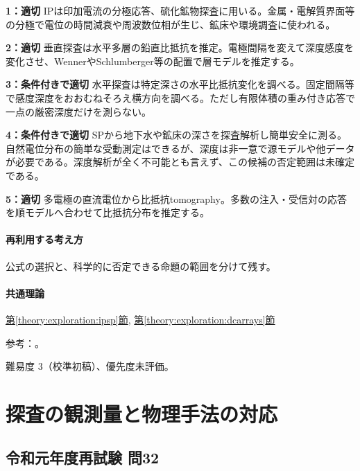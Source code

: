 \noindent\textbf{1：適切} IPは印加電流の分極応答、硫化鉱物探査に用いる。金属・電解質界面等の分極で電位の時間減衰や周波数位相が生じ、鉱床や環境調査に使われる。\par

\noindent\textbf{2：適切} 垂直探査は水平多層の鉛直比抵抗を推定。電極間隔を変えて深度感度を変化させ、WennerやSchlumberger等の配置で層モデルを推定する。\par

\noindent\textbf{3：条件付きで適切} 水平探査は特定深さの水平比抵抗変化を調べる。固定間隔等で感度深度をおおむねそろえ横方向を調べる。ただし有限体積の重み付き応答で一点の厳密深度だけを測らない。\par

\noindent\textbf{4：条件付きで適切} SPから地下水や鉱床の深さを探査解析し簡単安全に測る。自然電位分布の簡単な受動測定はできるが、深度は非一意で源モデルや他データが必要である。深度解析が全く不可能とも言えず、この候補の否定範囲は未確定である。\par

\noindent\textbf{5：適切} 多電極の直流電位から比抵抗tomography。多数の注入・受信対の応答を順モデルへ合わせて比抵抗分布を推定する。\par

\paragraph{再利用する考え方} 公式の選択と、科学的に否定できる命題の範囲を分けて残す。

\paragraph{共通理論} \hyperref[theory:exploration:ipsp]{第\ref*{theory:exploration:ipsp}節}, \hyperref[theory:exploration:dcarrays]{第\ref*{theory:exploration:dcarrays}節}

\par 参考：\cite{epa_sp,epa_ip,epa_resistivity}。

\par 難易度 3（校準初稿）、優先度未評価。

\section{探査の観測量と物理手法の対応}

\subsection{令和元年度再試験 問32}
\label{q:r01-ret-applied-32}

